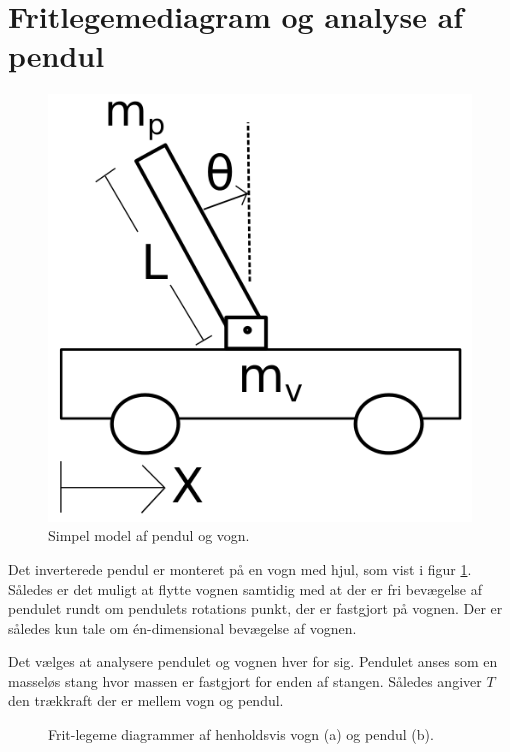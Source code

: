 \section{Fritlegemediagram og analyse af pendul}\label{sec:sec_fritlegemediagram}

\begin{figure}
	\centering
	\includegraphics[width=.3\textwidth]{billeder/pendul_vogn.png}
	\caption{Simpel model af pendul og vogn.}
	\label{fig:pendul_vogn}
\end{figure}
\FloatBlock

Det inverterede pendul er monteret på en vogn med hjul, som vist i figur \ref{fig:pendul_vogn}.
Således er det muligt at flytte vognen samtidig med at der er fri bevægelse af pendulet rundt om pendulets rotations punkt, der er fastgjort på vognen.
Der er således kun tale om én-dimensional bevægelse af vognen.

Det vælges at analysere pendulet og vognen hver for sig.
Pendulet anses som en masseløs stang hvor massen er fastgjort for enden af stangen. 
Således angiver $T$ den trækkraft der er mellem vogn og pendul.
\begin{figure}
	\centering
	\caption[Frit-legeme digrammer af vogn og pendul]{Frit-legeme diagrammer af henholdsvis vogn (a) og pendul (b).}
	\label{fig:fridiagrammer}
\end{figure}

